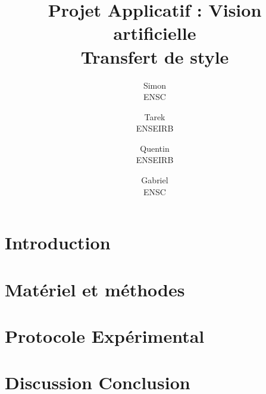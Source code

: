 \documentclass[10pt,twocolumn,letterpaper]{article}
\begin{document}
\title{Projet Applicatif : Vision artificielle\\Transfert de style}

\author{Simon \\
ENSC\\
{\tt\small }
\and
Tarek \\
ENSEIRB\\
{\tt\small }
\and
Quentin \\
ENSEIRB\\
{\tt\small }
\and
Gabriel \\
ENSC\\
{\tt\small }
}

\maketitle

\begin{abstract}

\end{abstract}

\section{Introduction}

\section{Matériel et méthodes}


\section{Protocole Expérimental}


\section{Discussion Conclusion}



{\small


}
\end{document}
